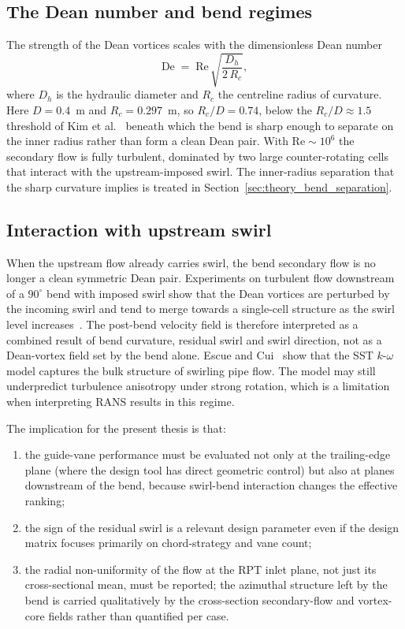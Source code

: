 \subsection{The Dean number and bend regimes}
\label{sec:theory_dean_number}
 
The strength of the Dean vortices scales with the dimensionless Dean number
\begin{equation}
\mathrm{De} \;=\; \mathrm{Re}\,\sqrt{\frac{D_h}{2\,R_c}},
\label{eq:dean}
\end{equation}
where $D_h$ is the hydraulic diameter and $R_c$ the centreline radius of
curvature. Here $D = 0.4$~m and $R_c = 0.297$~m, so $R_c/D = 0.74$, below
the $R_c/D \approx 1.5$ threshold of Kim et al.~\cite{KimYadavKim2014}
beneath which the bend is sharp enough to separate on the inner radius
rather than form a clean Dean pair. With $\mathrm{Re} \sim 10^6$ the
secondary flow is fully turbulent, dominated by two large counter-rotating
cells that interact with the upstream-imposed swirl. The inner-radius
separation that the sharp curvature implies is treated in
Section~\ref{sec:theory_bend_separation}.
 
\subsection{Interaction with upstream swirl}
\label{sec:theory_swirl_bend_interaction}
 
When the upstream flow already carries swirl, the bend secondary flow is no longer a clean symmetric Dean pair. Experiments on turbulent flow downstream of a \(90^\circ\) bend with imposed swirl show that the Dean vortices are perturbed by the incoming swirl and tend to merge towards a single-cell structure as the swirl level increases~\cite{KalpakliOrlu2013}. The post-bend velocity field is therefore interpreted as a combined result of bend curvature, residual swirl and swirl direction, not as a Dean-vortex field set by the bend alone. Escue and Cui~\cite{EscueCui2010} show that the SST \(k\)-\(\omega\) model captures the bulk structure of swirling pipe flow. The model may still underpredict turbulence anisotropy under strong rotation, which is a limitation when interpreting RANS results in this regime.
 
The implication for the present thesis is that:
\begin{enumerate}
  \item the guide-vane performance must be evaluated not only at the trailing-edge plane (where the design tool has direct geometric control) but also at planes downstream of the bend, because swirl-bend interaction changes the effective ranking;
  \item the sign of the residual swirl is a relevant design parameter even if the design matrix focuses primarily on chord-strategy and vane count;
  \item the radial non-uniformity of the flow at the RPT inlet plane, not just its cross-sectional mean, must be reported; the azimuthal structure left by the bend is carried qualitatively by the cross-section secondary-flow and vortex-core fields rather than quantified per case.
\end{enumerate}
 
